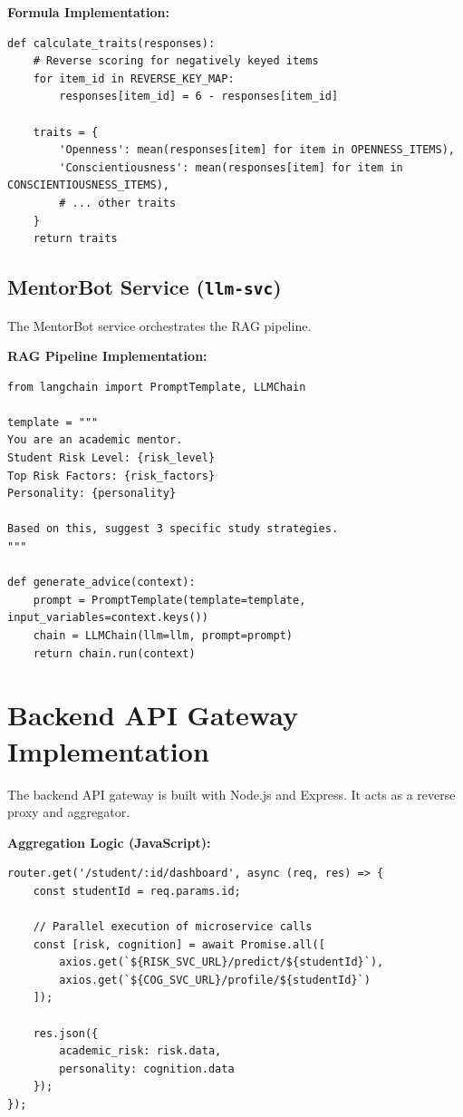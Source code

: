 \documentclass[12pt,a4paper]{report}
\begin{document}
\textbf{Formula Implementation:}
\begin{verbatim}
def calculate_traits(responses):
    # Reverse scoring for negatively keyed items
    for item_id in REVERSE_KEY_MAP:
        responses[item_id] = 6 - responses[item_id]
        
    traits = {
        'Openness': mean(responses[item] for item in OPENNESS_ITEMS),
        'Conscientiousness': mean(responses[item] for item in CONSCIENTIOUSNESS_ITEMS),
        # ... other traits
    }
    return traits
\end{verbatim}

\subsection{MentorBot Service (\texttt{llm-svc})}
The MentorBot service orchestrates the RAG pipeline.

\textbf{RAG Pipeline Implementation:}
\begin{verbatim}
from langchain import PromptTemplate, LLMChain

template = """
You are an academic mentor.
Student Risk Level: {risk_level}
Top Risk Factors: {risk_factors}
Personality: {personality}

Based on this, suggest 3 specific study strategies.
"""

def generate_advice(context):
    prompt = PromptTemplate(template=template, input_variables=context.keys())
    chain = LLMChain(llm=llm, prompt=prompt)
    return chain.run(context)
\end{verbatim}

\section{Backend API Gateway Implementation}

The backend API gateway is built with Node.js and Express. It acts as a reverse proxy and aggregator.

\textbf{Aggregation Logic (JavaScript):}
\begin{verbatim}
router.get('/student/:id/dashboard', async (req, res) => {
    const studentId = req.params.id;
    
    // Parallel execution of microservice calls
    const [risk, cognition] = await Promise.all([
        axios.get(`${RISK_SVC_URL}/predict/${studentId}`),
        axios.get(`${COG_SVC_URL}/profile/${studentId}`)
    ]);
    
    res.json({
        academic_risk: risk.data,
        personality: cognition.data
    });
});
\end{verbatim}
\end{document}
